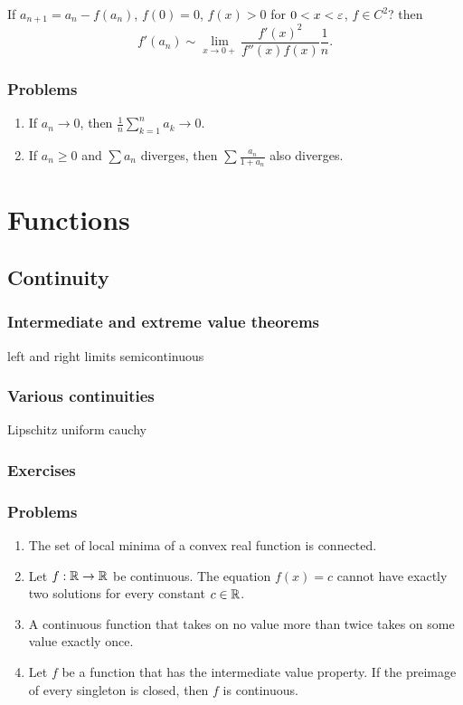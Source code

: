 \documentclass{../../large}
\begin{document}
\begin{prb}
If $a_{n+1}=a_n-f(a_n)$, $f(0)=0$, $f(x)>0$ for $0<x<\varepsilon$, $f\in C^2$? then
\[f'(a_n)\sim\lim_{x\to0+}\frac{f'(x)^2}{f''(x)f(x)}\frac1n.\]
\end{prb}
\section*{Problems}
\begin{enumerate}
\item If $a_n\to0$, then $\frac1n\sum_{k=1}^na_k\to0$.
\item If $a_n\ge0$ and $\sum a_n$ diverges, then $\sum\frac{a_n}{1+a_n}$ also diverges.
\end{enumerate}






\part{Functions}

\chapter{Continuity}
\section{Intermediate and extreme value theorems}

left and right limits
semicontinuous


\section{Various continuities}

Lipschitz
uniform
cauchy


\section*{Exercises}

\section*{Problems}
\begin{enumerate}
\item The set of local minima of a convex real function is connected.
\item Let $f:\mathbb{R}\to\mathbb{R}$ be continuous.
The equation $f(x)=c$ cannot have exactly two solutions for every constant $c\in\mathbb{R}$.
\item A continuous function that takes on no value more than twice takes on some value exactly once.
\item Let $f$ be a function that has the intermediate value property.
If the preimage of every singleton is closed, then $f$ is continuous.
\end{enumerate}
\end{document}
